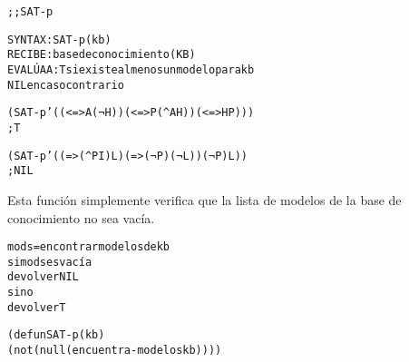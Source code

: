 \begin{aibox}{\function}
\begin{alltt}
;; SAT-p

SYNTAX: SAT-p (kb)
RECIBE   : base de conocimiento (KB)
EVALÚA A : T si existe al menos un modelo para kb
            NIL en caso contrario
\end{alltt}
\end{aibox}

\begin{aibox}{\examples}
\begin{alltt}
(SAT-p '((<=> A (¬ H)) (<=> P (^ A H)) (<=> H P))) 
; T

(SAT-p '((=> (^ P I) L) (=> (¬ P) (¬ L)) (¬ P) L)) 
; NIL
\end{alltt}

\end{aibox}

\begin{aibox}{\comments}
Esta función simplemente verifica que la lista de modelos de la base de conocimiento no sea vacía.
\end{aibox}
\begin{aibox}{\pseudocode}
\begin{alltt}
mods = encontrar modelos de kb
si mods es vacía
    devolver NIL
si no
    devolver T
\end{alltt}
\end{aibox}
\begin{aibox}{\code}

\begin{alltt}

(defun SAT-p (kb)
  (not (null (encuentra-modelos kb))))

\end{alltt}
\end{aibox}
